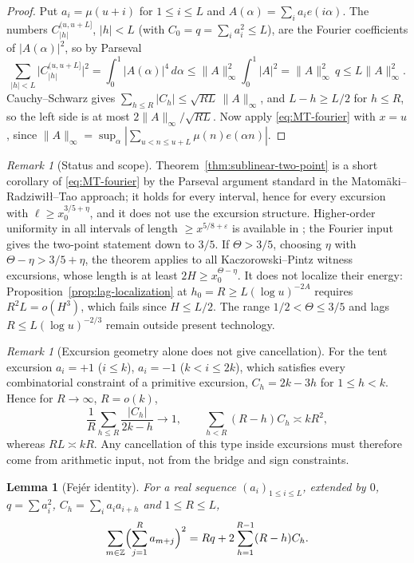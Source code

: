 \documentclass[11pt]{amsart}
\numberwithin{equation}{section}
\theoremstyle{plain}
\newtheorem{lemma}[theorem]{Lemma}
\theoremstyle{definition}
\theoremstyle{remark}
\newtheorem{remark}[theorem]{Remark}
\newcommand{\eps}{\varepsilon}
\begin{document}
\begin{proof}
Put $a_i=\mu(u+i)$ for $1\le i\le L$ and $A(\alpha)=\sum_ia_ie(i\alpha)$.
The numbers $C^{(u,u+L]}_{|h|}$, $|h|<L$ (with $C_0=q=\sum_ia_i^2\le L$), are
the Fourier coefficients of $|A(\alpha)|^2$, so by Parseval
\[
\sum_{|h|<L}\bigl|C^{(u,u+L]}_{|h|}\bigr|^2=\int_0^1|A(\alpha)|^4\,d\alpha
\le\|A\|_\infty^2\int_0^1|A|^2=\|A\|_\infty^2\,q\le L\|A\|_\infty^2 .
\]
Cauchy--Schwarz gives $\sum_{h\le R}|C_h|\le\sqrt{RL}\,\|A\|_\infty$, and
$L-h\ge L/2$ for $h\le R$, so the left side is at most
$2\|A\|_\infty/\sqrt{RL}$. Now apply \eqref{eq:MT-fourier} with $x=u$,
since $\|A\|_\infty=\sup_\alpha|\sum_{u<n\le u+L}\mu(n)e(\alpha n)|$.
\end{proof}

\begin{remark}[Status and scope]
\label{rem:sublinear-status}
Theorem~\ref{thm:sublinear-two-point} is a short corollary of
\eqref{eq:MT-fourier} by the Parseval argument standard in the
Matom\"aki--Radziwi\l\l--Tao approach; it holds for every interval, hence
for every excursion with $\ell\ge x_0^{3/5+\eta}$, and it does not use the
excursion structure. Higher-order uniformity in all intervals of length
$\ge x^{5/8+\eps}$ is available in \cite{MSTT23}; the Fourier input gives
the two-point statement down to $3/5$. If $\Theta>3/5$, choosing $\eta$ with
$\Theta-\eta>3/5+\eta$, the theorem applies to all Kaczorowski--Pintz witness
excursions, whose length is at least $2H\ge x_0^{\Theta-\eta}$. It does not
localize their energy: Proposition~\ref{prop:lag-localization} at
$h_0=R\ge L(\log u)^{-2A}$ requires $R^2L=o(H^3)$, which fails since
$H\le L/2$. The range $1/2<\Theta\le3/5$ and lags $R\le L(\log u)^{-2/3}$
remain outside present technology.
\end{remark}

\begin{remark}[Excursion geometry alone does not give cancellation]
\label{rem:tent-chowla}
For the tent excursion $a_i=+1$ ($i\le k$), $a_i=-1$ ($k<i\le2k$), which
satisfies every combinatorial constraint of a primitive excursion,
$C_h=2k-3h$ for $1\le h<k$. Hence for $R\to\infty$, $R=o(k)$,
\[
\frac1R\sum_{h\le R}\frac{|C_h|}{2k-h}\longrightarrow1,
\qquad
\sum_{h<R}(R-h)C_h\asymp kR^2,
\]
whereas $RL\asymp kR$. Any cancellation of this type inside excursions must
therefore come from arithmetic input, not from the bridge and sign
constraints.
\end{remark}

\begin{lemma}[Fej\'er identity]
\label{lem:fejer}
For a real sequence $(a_i)_{1\le i\le L}$, extended by $0$, $q=\sum a_i^2$,
$C_h=\sum_ia_ia_{i+h}$ and $1\le R\le L$,
\[
\sum_{m\in\mathbb Z}\Bigl(\sum_{j=1}^{R}a_{m+j}\Bigr)^2
=Rq+2\sum_{h=1}^{R-1}(R-h)C_h .
\]
\end{lemma}
\end{document}
